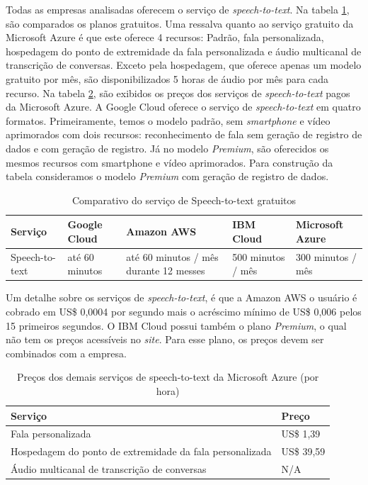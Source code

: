 \documentclass{article}
\begin{document}
Todas as empresas analisadas oferecem o serviço de \textit{speech-to-text}. Na tabela \ref{tab:table9}, são comparados os planos gratuitos. Uma ressalva quanto ao serviço gratuito da Microsoft Azure é que este oferece 4 recursos: Padrão, fala personalizada, hospedagem do ponto de extremidade da fala personalizada e áudio multicanal de transcrição de conversas. Exceto pela hospedagem, que oferece apenas um modelo gratuito por mês, são disponibilizados 5 horas de áudio por mês para cada recurso. Na tabela \ref{tab:table10}, são exibidos os preços dos serviços de \textit{speech-to-text} pagos da Microsoft Azure.
A Google Cloud oferece o serviço de \textit{speech-to-text} em quatro formatos. Primeiramente, temos o modelo padrão, sem \textit{smartphone} e vídeo aprimorados com dois recursos: reconhecimento de fala sem geração de registro de dados e com geração de registro. Já no modelo \textit{Premium}, são oferecidos os mesmos recursos com smartphone e vídeo aprimorados. Para construção da tabela consideramos o modelo \textit{Premium} com geração de registro de dados.

\begin{table}[!!ht]
 \caption{Comparativo do serviço de Speech-to-text gratuitos}
  \centering
  \begin{tabular}{lllll}
    \cmidrule(r){1-5}
    Serviço & Google Cloud & Amazon AWS & IBM Cloud & Microsoft Azure \\
    \midrule
    Speech-to-text & até 60 minutos & até 60 minutos / mês durante 12 messes & 500 minutos / mês & 300 minutos / mês \\
    \bottomrule
  \end{tabular}
  \label{tab:table9}
\end{table}

Um detalhe sobre os serviços de \textit{speech-to-text}, é que a Amazon AWS o usuário é cobrado em US\$ 0,0004 por segundo mais o acréscimo mínimo de US\$ 0,006 pelos 15 primeiros segundos. O IBM Cloud possui também o plano \textit{Premium}, o qual não tem os preços acessíveis no \textit{site}. Para esse plano, os preços devem ser combinados com a empresa.

\begin{table}[!!ht]
 \caption{Preços dos demais serviços de speech-to-text da Microsoft Azure (por hora)}
  \centering
  \begin{tabular}{ll}
    \cmidrule(r){1-2}
    Serviço & Preço \\
    \midrule
    Fala personalizada & US\$ 1,39\\ %
    Hospedagem do ponto de extremidade da fala personalizada & US\$ 39,59 \\ %
    Áudio multicanal de transcrição de conversas & N/A \\
    \bottomrule
  \end{tabular}
  \label{tab:table10}
\end{table}
\end{document}
